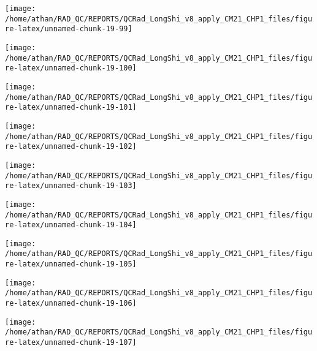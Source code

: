 \documentclass[
  10pt,
  a4paper,oneside]{article}
\begin{document}
\begin{center}\texttt{[image: /home/athan/RAD\_QC/REPORTS/QCRad\_LongShi\_v8\_apply\_CM21\_CHP1\_files/figure-latex/unnamed-chunk-19-99]} \end{center}

\begin{center}\texttt{[image: /home/athan/RAD\_QC/REPORTS/QCRad\_LongShi\_v8\_apply\_CM21\_CHP1\_files/figure-latex/unnamed-chunk-19-100]} \end{center}

\begin{center}\texttt{[image: /home/athan/RAD\_QC/REPORTS/QCRad\_LongShi\_v8\_apply\_CM21\_CHP1\_files/figure-latex/unnamed-chunk-19-101]} \end{center}

\begin{center}\texttt{[image: /home/athan/RAD\_QC/REPORTS/QCRad\_LongShi\_v8\_apply\_CM21\_CHP1\_files/figure-latex/unnamed-chunk-19-102]} \end{center}

\begin{center}\texttt{[image: /home/athan/RAD\_QC/REPORTS/QCRad\_LongShi\_v8\_apply\_CM21\_CHP1\_files/figure-latex/unnamed-chunk-19-103]} \end{center}

\begin{center}\texttt{[image: /home/athan/RAD\_QC/REPORTS/QCRad\_LongShi\_v8\_apply\_CM21\_CHP1\_files/figure-latex/unnamed-chunk-19-104]} \end{center}

\begin{center}\texttt{[image: /home/athan/RAD\_QC/REPORTS/QCRad\_LongShi\_v8\_apply\_CM21\_CHP1\_files/figure-latex/unnamed-chunk-19-105]} \end{center}

\begin{center}\texttt{[image: /home/athan/RAD\_QC/REPORTS/QCRad\_LongShi\_v8\_apply\_CM21\_CHP1\_files/figure-latex/unnamed-chunk-19-106]} \end{center}

\begin{center}\texttt{[image: /home/athan/RAD\_QC/REPORTS/QCRad\_LongShi\_v8\_apply\_CM21\_CHP1\_files/figure-latex/unnamed-chunk-19-107]} \end{center}
\end{document}
